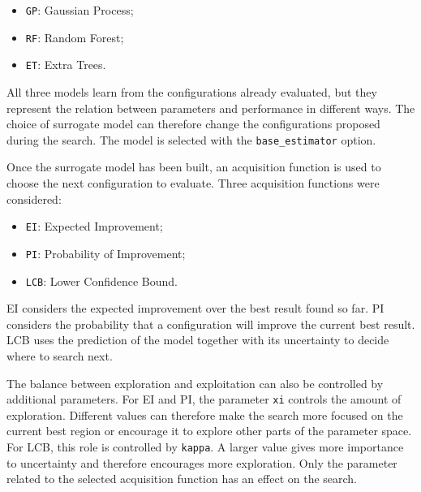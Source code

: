 \begin{itemize}
    \item \texttt{GP}: Gaussian Process;
    \item \texttt{RF}: Random Forest;
    \item \texttt{ET}: Extra Trees.
\end{itemize}
All three models learn from the configurations already evaluated, but
they represent the relation between parameters and performance in
different ways. The choice of surrogate model can therefore change the
configurations proposed during the search.
The model is selected with the \texttt{base\_estimator} option.  

Once the surrogate model has been built, an acquisition function is used
to choose the next configuration to evaluate. Three acquisition
functions were considered:

\begin{itemize}
    \item \texttt{EI}: Expected Improvement;
    \item \texttt{PI}: Probability of Improvement;
    \item \texttt{LCB}: Lower Confidence Bound.
\end{itemize}
EI considers the expected improvement over the best result found so far.
PI considers the probability that a configuration will improve the
current best result. LCB uses the prediction of the model together with
its uncertainty to decide where to search next.

 

The balance between exploration and exploitation can also be controlled
by additional parameters.
For EI and PI, the parameter \texttt{xi} controls the amount of
exploration. Different values can therefore make the search more focused
on the current best region or encourage it to explore other parts of the
parameter space.
For LCB, this role is controlled by \texttt{kappa}. A larger value gives
more importance to uncertainty and therefore encourages more exploration.
Only the parameter related to the selected acquisition function has an
effect on the search.

